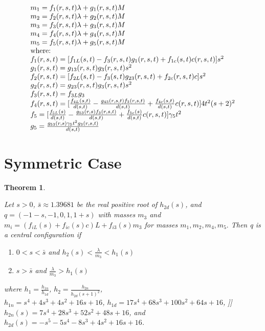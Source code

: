 \documentclass[11pt,leqno]{article}
\newtheorem{theorem}{Theorem}[section]
\theoremstyle{definition}
\theoremstyle{remark}
\numberwithin{equation}{section}
\begin{document}
\begin{equation}\begin{array}{l}
m_{1}=f_{1}(r,s,t)\lambda+g_{1}(r,s,t)M \\
m_{2}=f_{2}(r,s,t)\lambda+g_{2}(r,s,t)M \\
m_{3}=f_{3}(r,s,t)\lambda+g_{3}(r,s,t)M \\
m_{4}=f_{4}(r,s,t)\lambda+g_{4}(r,s,t)M \\
m_{5}=f_{5}(r,s,t)\lambda+g_{5}(r,s,t)M \\
$where:$ \\
f_{1}(r,s,t)=[f_{1L}(s,t)-f_{3}(r,s,t)g_{1}(r,s,t)+f_{1c}(s,t)c(r,s,t)]s^{2} \\
g_{1}(r,s,t)=g_{13}(r,s,t)g_{3}(r,s,t)s^{2} \\
f_{2}(r,s,t)=[f_{2L}(s,t)-f_{3}(s,t)g_{23}(r,s,t)+f_{2c}(r,s,t)c]s^{2} \\
g_{2}(r,s,t)=g_{23}(r,s,t)g_{3}(r,s,t)s^{2} \\
f_{3}(r,s,t)=f_{3L}g_{3} \\
f_{4}(r,s,t)=[\frac{f_{4L}(s,t)}{d(s,t)}-\frac{g_{43}(r,s,t)f_{3}(r,s,t)}{d(s,t)}+\frac{f_{4c}(s,t)}{d(s,t)}c(r,s,t)]4t^{2}(s+2)^{2} \\
f_{5}=[\frac{f_{5L}(s)}{d(s,t)}-\frac{g_{53}(r,s)f_{3}(r,s,t)}{d(s,t)}+\frac{f_{5c}(s)}{d(s,t)}c(r,s,t)]\gamma_{5}t^{2} \\
g_{5}=\frac{g_{53}(r,s)\gamma_{5}t^{2}g_{3}(r,s,t)}{d(s,t)} \\
\end{array}
\end{equation}



\section{Symmetric Case}

\begin{theorem}\label{thm5}

\emph{Let $s>0$, $\bar{s}\approx1.39681$ be the
real positive root of $h_{2d}(s)$, and $q=(-1-s,-1,0,1,1+s)$ with
masses $m_{3}$ and $m_{i}=(f_{iL}(s)+f_{ic}(s)c)L+f_{i3}(s)m_{3}$
for masses $m_{1},m_{2},m_{4},m_{5}.$ Then q is a central configuration
if}
\begin{enumerate}
\item \emph{$0<s<\bar{s}$ and $h_{2}(s)<\frac{\lambda}{m_{3}}<h_{1}(s)$}
\item \emph{$s>\bar{s}$ and $\frac{\lambda}{m_{3}}>h_{1}(s)$}
\end{enumerate}
where $h_{1}=\frac{h_{1n}}{h_{1d}}$, $h_{2}=\frac{h_{2n}}{h_{2d}(s+1)^{2}}$, \\
$h_{1n}=s^{4}+4s^{3}+4s^{2}+16s+16$, $h_{1d}=17s^{4}+68s^{3}+100s^{2}+64s+16$, ]]
$h_{2n}(s)=7s^{4}+28s^{3}+52s^{2}+48s+16$, and $h_{2d}(s)=-s^{5}-5s^{4}-8s^{3}+4s^{2}+16s+16$.
\end{theorem}
\end{document}
